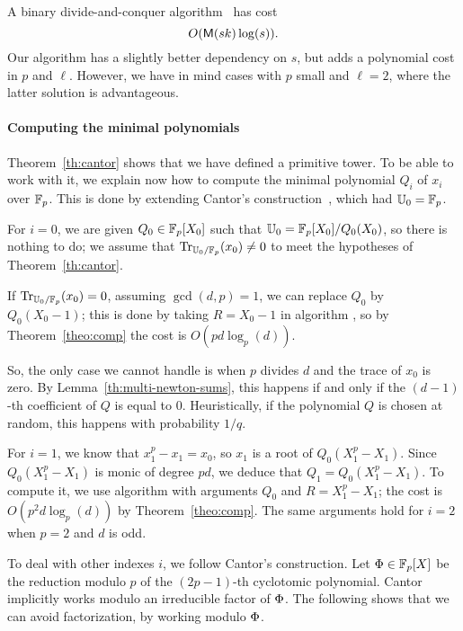 \begin{nota}
  A binary divide-and-conquer algorithm~\cite[Exercise~9.20]{vzGG} has
  cost 
  \[O(\mathsf{M}(sk)\log(s))\text{.}\] Our algorithm has a slightly better
  dependency on $s$, but adds a polynomial cost in $p$ and
  $\ell$. However, we have in mind cases with $p$ small and $\ell=2$,
  where the latter solution is advantageous.
\end{nota}

\paragraph{Computing the minimal polynomials}
Theorem~\ref{th:cantor} shows that we have defined a primitive
tower. To be able to work with it, we explain now how to compute the
minimal polynomial $Q_i$ of $x_i$ over $\mathbb{F}_p$. This is done by
extending Cantor's construction~\cite{cantor89}, which had $\mathbb{U}_0=\mathbb{F}_p$.

For $i=0$, we are given $Q_0\in\mathbb{F}_p[X_0]$ such that
$\mathbb{U}_0=\mathbb{F}_p[X_0]/Q_0(X_0)$, so there is nothing to do; we assume that
$\operatorname{Tr}_{\mathbb{U}_0/\mathbb{F}_p}(x_0)\ne0$ to meet the hypotheses of
Theorem~\ref{th:cantor}. 

\begin{remark}
  \label{rk:comp-minim-polyn}
  If $\operatorname{Tr}_{\mathbb{U}_0/\mathbb{F}_p}(x_0)=0$, assuming $\gcd(d,p)=1$, we can replace
  $Q_0$ by $Q_0(X_0-1)$; this is done by taking $R=X_0-1$ in algorithm
  , so by Theorem~\ref{theo:comp} the cost is
  $O(pd \log_p(d))$.

  So, the only case we cannot handle is when $p$ divides $d$ and the
  trace of $x_0$ is zero. By Lemma~\ref{th:multi-newton-sums}, this
  happens if and only if the $(d-1)$-th coefficient of $Q$ is equal to
  $0$. Heuristically, if the polynomial $Q$ is chosen at random, this
  happens with probability $1/q$.
\end{remark}

For $i=1$, we know that $x_1^p-x_1=x_0$, so $x_1$ is a root of
$Q_0(X_1^p-X_1)$. Since $Q_0(X_1^p-X_1)$ is monic of degree $pd$, we
deduce that $Q_1=Q_0(X_1^p-X_1)$. To compute it, we use algorithm
 with arguments $Q_0$ and $R=X_1^p-X_1$; the cost is
$O(p^2d \log_p(d))$ by Theorem~\ref{theo:comp}. The same arguments
hold for $i=2$ when $p=2$ and $d$ is odd.

To deal with other indexes $i$, we follow Cantor's construction.  Let
$\Phi\in \mathbb{F}_p[X]$ be the reduction modulo $p$ of the $(2p-1)$-th
cyclotomic polynomial. Cantor implicitly works modulo an irreducible
factor of $\Phi$. The following shows that we can avoid
factorization, by working modulo $\Phi$.

